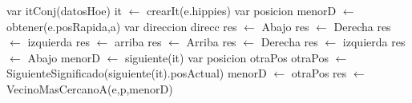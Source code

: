 \begin{algorithm}[H]
\begin{algorithmic}[1]
 
	\State var itConj(datosHoe) it $\gets$  crearIt(e.hippies) 
	\State var posicion menorD  $\gets$  obtener(e.posRapida,a) 
	\State var direccion direcc 
	 
		 
			 
				\State res $\gets$ Abajo \Else {}
				 
					\State res $\gets$ Derecha \Else {}
					 
						\State res $\gets$ izquierda \Else {}
						\State res $\gets$ arriba 
					\EndIf
				\EndIf
			\EndIf
		\Else 
			 
				\State res $\gets$ Arriba \Else {}
				 
					\State res $\gets$ Derecha \Else {}
					 
						\State res $\gets$ izquierda \Else {}
						\State res $\gets$ Abajo 
					\EndIf
				\EndIf
			\EndIf
		\EndIf
	\Else
		\State menorD $\gets$ siguiente(it) 
		\State var posicion otraPos 
		 
			\State otraPos $\gets$ SiguienteSignificado(siguiente(it).posActual) 
			 
				\State menorD $\gets$ otraPos 
			\EndIf
		\EndWhile
		\State res $\gets$ VecinoMasCercanoA(e,p,menorD)	 
	\EndIf
\EndFunction
\end{algorithmic}
\end{algorithm}

